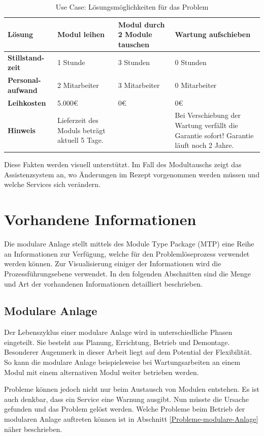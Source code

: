 \begin{table}[htbp]
\centering
\begin{tabular}{p{}|p{}|p{}|p{}|}
\textbf{Lösung} & Modul leihen & Modul durch 2 Module tauschen & Wartung aufschieben \\
\hline
\textbf{Stillstand-zeit} & 1 Stunde & 3 Stunden & 0 Stunden \\
\hline
\textbf{Personal-aufwand	} & 2 Mitarbeiter & 3 Mitarbeiter & 0 Mitarbeiter \\
\hline
\textbf{Leihkosten} & 5.000€ & 0€ & 0€ \\
\hline
\textbf{Hinweis} & Lieferzeit des Moduls beträgt aktuell 5 Tage. & & Bei Verschiebung der Wartung verfällt die Garantie sofort! Garantie läuft noch 2 Jahre. \\
\hline
\end{tabular}
\caption{Use Case: Lösungsmöglichkeiten für das Problem}
\label{tab:UseCase-Lösungen}
\end{table}
Diese Fakten werden visuell unterstützt. Im Fall des Modultauschs zeigt das Assistenzsystem an, wo Änderungen im Rezept vorgenommen werden müssen und welche Services sich verändern.

\section{Vorhandene Informationen}
Die modulare Anlage stellt mittels des Module Type Package (MTP) eine Reihe an Informationen zur Verfügung, welche für den Problemlöseprozess verwendet werden können. Zur Visualisierung einiger der Informationen wird die Prozessführungsebene verwendet. In den folgenden Abschnitten sind die Menge und Art der vorhandenen Informationen detailliert beschrieben. 

\subsection{Modulare Anlage}
Der Lebenszyklus einer modulare Anlage wird in unterschiedliche Phasen eingeteilt. Sie besteht aus Planung, Errichtung, Betrieb und Demontage. \cite{Obst2013}  Besonderer Augenmerk in dieser Arbeit liegt auf dem Potential der Flexibilität. So kann die modulare Anlage beispielsweise bei Wartungsarbeiten an einem Modul mit einem alternativen Modul weiter betrieben werden.

Probleme können jedoch nicht nur beim Austausch von Modulen entstehen. Es ist auch denkbar, dass ein Service eine Warnung ausgibt. Nun müsste die Ursache gefunden und das Problem gelöst werden. Welche Probleme beim Betrieb der modularen Anlage auftreten können ist in Abschnitt \ref{Probleme-modulare-Anlage} näher beschrieben.

